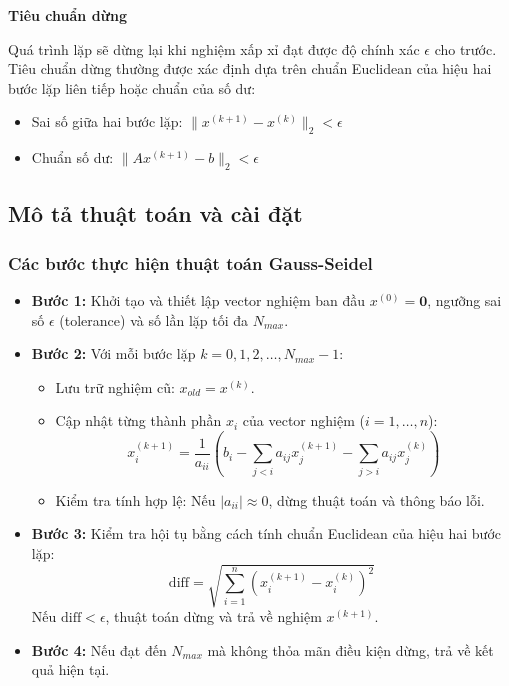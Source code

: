 \documentclass[a4paper]{article}
\begin{document}
\textbf{Tiêu chuẩn dừng}

Quá trình lặp sẽ dừng lại khi nghiệm xấp xỉ đạt được độ chính xác $\epsilon$ cho trước. Tiêu chuẩn dừng thường được xác định dựa trên chuẩn Euclidean của hiệu hai bước lặp liên tiếp hoặc chuẩn của số dư:
\begin{itemize}
    \item Sai số giữa hai bước lặp: $\|x^{(k+1)} - x^{(k)}\|_2 < \epsilon$
    \item Chuẩn số dư: $\|Ax^{(k+1)} - b\|_2 < \epsilon$
\end{itemize}

\subsection{Mô tả thuật toán và cài đặt}

\subsubsection{Các bước thực hiện thuật toán Gauss-Seidel}
\begin{itemize}
    \item \textbf{ Bước 1:} 
    Khởi tạo và thiết lập vector nghiệm ban đầu $x^{(0)} = \mathbf{0}$, ngưỡng sai số $\epsilon$ (tolerance) và số lần lặp tối đa $N_{max}$.
    
    \item \textbf{Bước 2:} 
    Với mỗi bước lặp $k = 0, 1, 2, \dots, N_{max}-1$:
    \begin{itemize}
        \item Lưu trữ nghiệm cũ: $x_{old} = x^{(k)}$.
        \item Cập nhật từng thành phần $x_i$ của vector nghiệm ($i = 1, \dots, n$):
        \begin{equation}
            x_i^{(k+1)} = \frac{1}{a_{ii}} \left( b_i - \sum_{j < i} a_{ij} x_j^{(k+1)} - \sum_{j > i} a_{ij} x_j^{(k)} \right)
        \end{equation}
        \item Kiểm tra tính hợp lệ: Nếu $|a_{ii}| \approx 0$, dừng thuật toán và thông báo lỗi.
    \end{itemize}
    
    \item \textbf{Bước 3:} 
    Kiểm tra hội tụ bằng cách tính chuẩn Euclidean của hiệu hai bước lặp:
    \begin{equation}
        \text{diff} = \sqrt{\sum_{i=1}^{n} (x_i^{(k+1)} - x_i^{(k)})^2}
    \end{equation}
    Nếu $\text{diff} < \epsilon$, thuật toán dừng và trả về nghiệm $x^{(k+1)}$.
    
    \item \textbf{Bước 4:} 
    Nếu đạt đến $N_{max}$ mà không thỏa mãn điều kiện dừng, trả về kết quả hiện tại.
\end{itemize}
\end{document}
